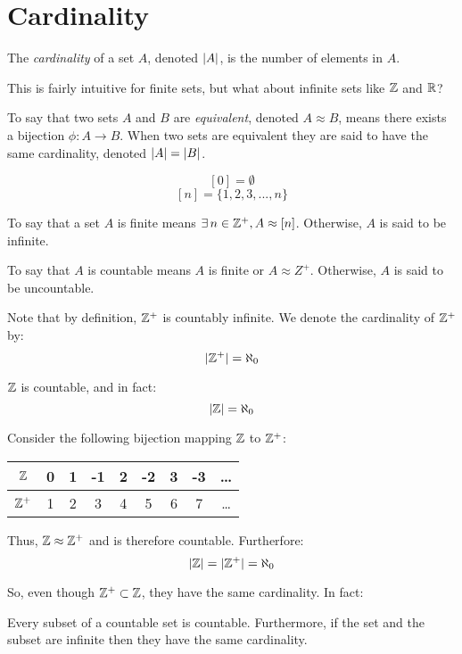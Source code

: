 \documentclass[letterpaper,12pt,fleqn]{article}
\begin{document}
\section*{Cardinality}
\begin{definition}
The \emph{cardinality} of a set $A$, denoted $\lvert A\rvert$, is the number of
elements in $A$.
\end{definition}
This is fairly intuitive for finite sets, but what about infinite sets like
$\mathbb{Z}$ and $\mathbb{R}$?
\begin{definition}
To say that two sets $A$ and $B$ are \emph{equivalent}, denoted $A\approx B$,
means there exists a bijection $\phi:A\to B$. When two sets are equivalent they
are said to have the same cardinality, denoted $\lvert A\rvert=\lvert B\rvert$.
\end{definition}
\begin{notation}
\[[0]=\emptyset\]
\[[n]=\{1,2,3,...,n\}\]
\end{notation}
\begin{definition}
To say that a set $A$ is finite means $\exists\,n\in\mathbb{Z}^+,A\approx [n]$.
Otherwise, $A$ is said to be infinite.

To say that $A$ is countable means $A$ is finite or $A\approx Z^+$.
Otherwise, $A$ is said to be uncountable.
\end{definition}
Note that by definition, $\mathbb{Z}^+$ is countably infinite. We denote the cardinality
of $\mathbb{Z}^+$ by:
\[\lvert\mathbb{Z}^+\rvert=\aleph_0\]
\begin{theorem}
$\mathbb{Z}$ is countable, and in fact:
\[\lvert\mathbb{Z}\rvert=\aleph_0\]
\end{theorem}
\begin{theproof}
Consider the following bijection mapping $\mathbb{Z}$ to $\mathbb{Z}^+$:

\begin{tabular}{c|cccccccc}
$\mathbb{Z}$ & 0 & 1 & -1 & 2 & -2 & 3 & -3 & \ldots \\
\hline
$\mathbb{Z}^+$ & 1 & 2 & 3 & 4 & 5 & 6 & 7 & \ldots \\
\end{tabular}

Thus, $\mathbb{Z}\approx\mathbb{Z}^+$ and is therefore countable. Furtherfore:
\[\lvert\mathbb{Z}\rvert=\lvert\mathbb{Z}^+\rvert=\aleph_0\]
\end{theproof}
So, even though $\mathbb{Z}^+\subset\mathbb{Z}$, they have the same cardinality. In fact:
\begin{theorem}
Every subset of a countable set is countable. Furthermore, if the set and the
subset are infinite then they have the same cardinality.
\end{theorem}
\end{document}
